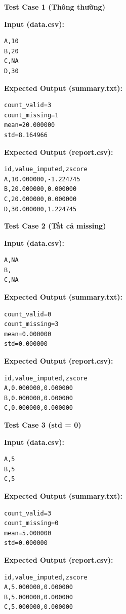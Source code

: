 \textbf{Test Case 1 (Thông thường)}

\textbf{Input (data.csv):}

\begin{lstlisting}
A,10
B,20
C,NA
D,30
\end{lstlisting}

\textbf{Expected Output (summary.txt):}

\begin{lstlisting}
count_valid=3
count_missing=1
mean=20.000000
std=8.164966
\end{lstlisting}

\textbf{Expected Output (report.csv):}

\begin{lstlisting}
id,value_imputed,zscore
A,10.000000,-1.224745
B,20.000000,0.000000
C,20.000000,0.000000
D,30.000000,1.224745
\end{lstlisting}

\vspace{0.5cm}

\textbf{Test Case 2 (Tất cả missing)}

\textbf{Input (data.csv):}

\begin{lstlisting}
A,NA
B,
C,NA
\end{lstlisting}

\textbf{Expected Output (summary.txt):}

\begin{lstlisting}
count_valid=0
count_missing=3
mean=0.000000
std=0.000000
\end{lstlisting}

\textbf{Expected Output (report.csv):}

\begin{lstlisting}
id,value_imputed,zscore
A,0.000000,0.000000
B,0.000000,0.000000
C,0.000000,0.000000
\end{lstlisting}

\vspace{0.5cm}

\textbf{Test Case 3 (std = 0)}

\textbf{Input (data.csv):}

\begin{lstlisting}
A,5
B,5
C,5
\end{lstlisting}

\textbf{Expected Output (summary.txt):}

\begin{lstlisting}
count_valid=3
count_missing=0
mean=5.000000
std=0.000000
\end{lstlisting}

\textbf{Expected Output (report.csv):}

\begin{lstlisting}
id,value_imputed,zscore
A,5.000000,0.000000
B,5.000000,0.000000
C,5.000000,0.000000
\end{lstlisting}